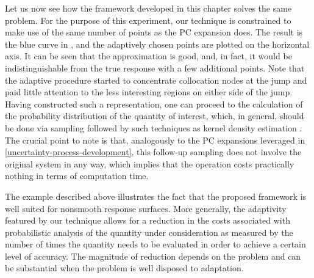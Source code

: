 Let us now see how the framework developed in this chapter solves the same
problem. For the purpose of this experiment, our technique is constrained to
make use of the same number of points as the \ac{PC} expansion does. The result
is the blue curve in , and the adaptively chosen points
are plotted on the horizontal axis. It can be seen that the approximation is
good, and, in fact, it would be indistinguishable from the true response with a
few additional points. Note that the adaptive procedure started to concentrate
collocation nodes at the jump and paid little attention to the less interesting
regions on either side of the jump. Having constructed such a representation,
one can proceed to the calculation of the probability distribution of the
quantity of interest, which, in general, should be done via sampling followed by
such techniques as kernel density estimation \cite{hastie2013}. The crucial
point to note is that, analogously to the \ac{PC} expansions leveraged in
\cref{uncertainty-process-development}, this follow-up sampling does not involve
the original system in any way, which implies that the operation costs
practically nothing in terms of computation time.

The example described above illustrates the fact that the proposed framework is
well suited for nonsmooth response surfaces. More generally, the adaptivity
featured by our technique allows for a reduction in the costs associated with
probabilistic analysis of the quantity under consideration as measured by the
number of times the quantity needs to be evaluated in order to achieve a certain
level of accuracy. The magnitude of reduction depends on the problem and can be
substantial when the problem is well disposed to adaptation.
